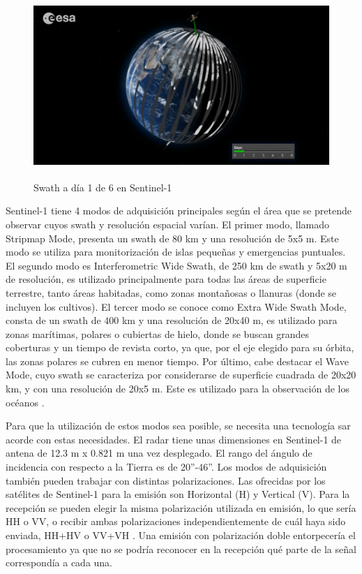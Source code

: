 \\
\begin{figure}[h]
    \centering
    \includegraphics[height=7cm]{archivos/tfg/swathS1} %
    \caption{Swath a día 1 de 6 en Sentinel-1 \cite{ESAcons}}
    \label{fig:swath}
\end{figure}
\par Sentinel-1 tiene 4 modos de adquisición principales según el área que se pretende observar cuyos swath y resolución espacial varían. El primer modo, llamado Stripmap Mode, presenta un swath de 80 km y una resolución de 5x5 m. Este modo se utiliza para monitorización de islas pequeñas y emergencias puntuales. El segundo modo es Interferometric Wide Swath, de 250 km de swath y 5x20 m de resolución, es utilizado principalmente para todas las áreas de superficie terrestre, tanto áreas habitadas, como zonas montañosas o llanuras (donde se incluyen los cultivos). El tercer modo se conoce como Extra Wide Swath Mode, consta de un swath de 400 km y una resolución de 20x40 m, es utilizado para zonas marítimas, polares o cubiertas de hielo, donde se buscan grandes coberturas y un tiempo de revista corto, ya que, por el eje elegido para su órbita, las zonas polares se cubren en menor tiempo. Por último, cabe destacar el Wave Mode, cuyo swath se caracteriza por considerarse de superficie cuadrada de 20x20 km, y con una resolución de 20x5 m. Este es utilizado para la observación de los océanos \cite{EOSs1}. 
\\
\par Para que la utilización de estos modos sea posible, se necesita una tecnología \gls{sar} acorde con estas necesidades. El radar tiene unas dimensiones en Sentinel-1 de antena de 12.3 m x 0.821 m una vez desplegado. El rango del ángulo de incidencia con respecto a la Tierra es de 20”-46”. Los modos de adquisición también pueden trabajar con distintas polarizaciones. Las ofrecidas por los satélites de Sentinel-1 para la emisión son Horizontal (H) y Vertical (V). Para la recepción se pueden elegir la misma polarización utilizada en emisión, lo que sería HH o VV, o recibir ambas polarizaciones independientemente de cuál haya sido enviada, HH+HV o VV+VH \cite{EOSs1}. Una emisión con polarización doble entorpecería el procesamiento ya que no se podría reconocer en la recepción qué parte de la señal correspondía a cada una. 



